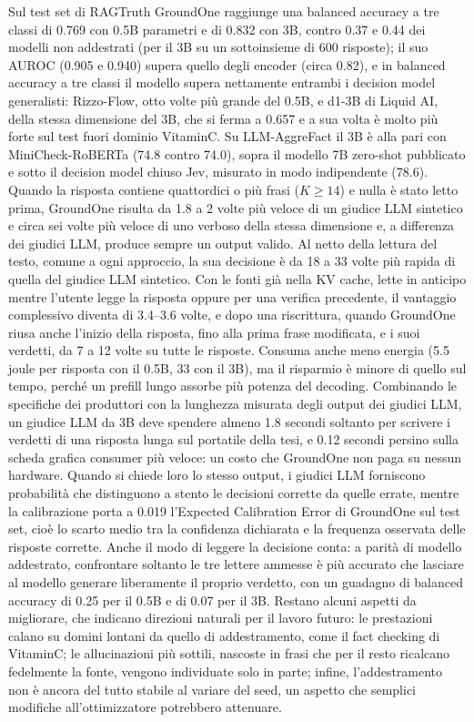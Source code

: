 Sul test set di RAGTruth GroundOne raggiunge una balanced accuracy a tre classi di 0.769 con 0.5B parametri e di 0.832
con 3B, contro 0.37 e 0.44 dei modelli non addestrati (per il 3B su un sottoinsieme di 600 risposte); il suo AUROC (0.905 e 0.940) supera quello degli encoder (circa 0.82), e in balanced accuracy a tre classi il modello supera nettamente entrambi i decision model generalisti: Rizzo-Flow, otto volte più grande del 0.5B, e d1-3B di Liquid AI, della stessa dimensione del 3B, che si ferma a 0.657 e a sua volta è molto più forte sul test fuori dominio VitaminC. Su
LLM-AggreFact il 3B è alla pari con MiniCheck-RoBERTa (74.8 contro 74.0), sopra il modello
7B zero-shot pubblicato e sotto il decision model chiuso Jev, misurato in modo indipendente (78.6). Quando la risposta contiene quattordici o più frasi ($K \geq 14$) e nulla è stato letto prima, GroundOne risulta da 1.8 a 2 volte più veloce di un giudice LLM sintetico e circa sei volte più veloce di uno verboso della stessa dimensione e, a differenza dei giudici LLM, produce sempre un output valido. Al netto della lettura del testo, comune a ogni approccio, la sua decisione è da 18 a 33 volte più rapida di quella del giudice LLM sintetico. Con le fonti già nella KV cache, lette in anticipo mentre l'utente legge la risposta oppure per una verifica precedente, il vantaggio complessivo diventa di 3.4--3.6 volte, e dopo una riscrittura, quando GroundOne riusa anche l'inizio della risposta, fino alla prima frase modificata, e i suoi verdetti, da 7 a 12 volte su tutte le risposte.
Consuma anche meno energia (5.5 joule per risposta con il 0.5B, 33 con il 3B), ma il risparmio è minore di quello sul
tempo, perché un prefill lungo assorbe più potenza del decoding. Combinando le specifiche dei produttori con la
lunghezza misurata degli output dei giudici LLM, un giudice LLM da 3B deve spendere almeno 1.8 secondi soltanto per scrivere i
verdetti di una risposta lunga sul portatile della tesi, e 0.12 secondi persino sulla scheda grafica consumer più veloce:
un costo che GroundOne non paga su nessun hardware.
Quando si chiede loro lo stesso output, i giudici LLM forniscono probabilità che distinguono a stento le decisioni
corrette da quelle errate, mentre la calibrazione porta a 0.019 l'Expected Calibration Error di GroundOne sul test set, cioè lo scarto medio tra
la confidenza dichiarata e la frequenza osservata delle risposte corrette. Anche
il modo di leggere la decisione conta: a parità di modello addestrato, confrontare soltanto le tre lettere ammesse è più
accurato che lasciare al modello generare liberamente il proprio verdetto, con un guadagno di balanced accuracy di 0.25
per il 0.5B e di 0.07 per il 3B. Restano alcuni aspetti da migliorare, che indicano direzioni naturali per il lavoro
futuro: le prestazioni calano su domini lontani da quello di addestramento, come il fact checking di VitaminC; le
allucinazioni più sottili, nascoste in frasi che per il resto ricalcano fedelmente la fonte, vengono individuate solo in
parte; infine, l'addestramento non è ancora del tutto stabile al variare del seed, un aspetto che semplici modifiche
all'ottimizzatore potrebbero attenuare.

